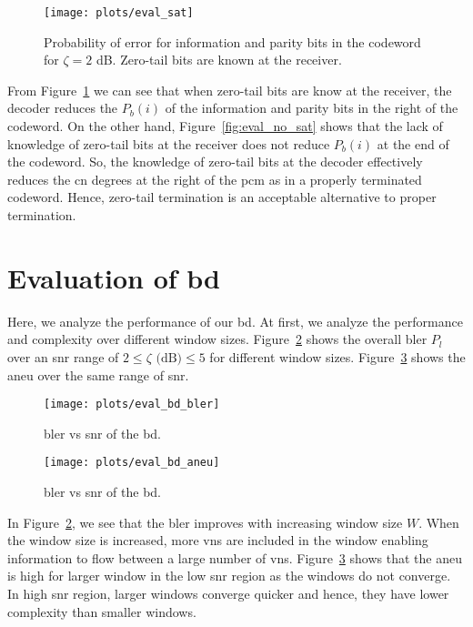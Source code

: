 \begin{figure}[htbp]
  \centering
  \texttt{[image: plots/eval\_sat]}
  \caption{Probability of error for information and parity bits in the codeword for $\zeta=2$ dB. Zero-tail bits are known at the receiver.}
  \label{fig:eval_sat}
\end{figure}
 
From Figure~\ref{fig:eval_sat} we can see that when zero-tail bits are know at the receiver, the decoder reduces the $P_b(i)$ of the information and parity bits in the right of the codeword. On the other hand, Figure~\ref{fig:eval_no_sat} shows that the lack of knowledge of zero-tail bits at the receiver does not reduce $P_b(i)$ at the end of the codeword. So, the knowledge of zero-tail bits at the decoder effectively reduces the \gls{cn} degrees at the right of the \gls{pcm} as in a properly terminated codeword. Hence, zero-tail termination is an acceptable alternative to proper termination.
 
\section{Evaluation of \acrlong{bd}}
Here, we analyze the performance of our \gls{bd}. At first, we analyze the performance and complexity over different window sizes. Figure~\ref{fig:eval_bd_bler} shows the overall \gls{bler} $P_l$ over an \gls{snr} range of $2\leq\zeta\text{ (dB)}\leq 5$ for different window sizes. Figure~\ref{fig:eval_bd_aneu} shows the \gls{aneu} over the same range of \gls{snr}.
\begin{figure}[htbp]
  \centering
  \texttt{[image: plots/eval\_bd\_bler]}
  \caption{\gls{bler} vs \gls{snr} of the \acrfull{bd}.}
  \label{fig:eval_bd_bler}
\end{figure}
\begin{figure}[htbp]
   \centering
  \texttt{[image: plots/eval\_bd\_aneu]}
  \caption{\gls{bler} vs \gls{snr} of the \acrfull{bd}.}
  \label{fig:eval_bd_aneu}
\end{figure}

In Figure~\ref{fig:eval_bd_bler}, we see that the \gls{bler} improves with increasing window size $W$. When the window size is increased, more \glspl{vn} are included in the window enabling information to flow between a large number of \glspl{vn}. Figure~\ref{fig:eval_bd_aneu} shows that the \gls{aneu} is high for larger window in the low \gls{snr} region as the windows do not converge. In high \gls{snr} region, larger windows converge quicker and hence, they have lower complexity than smaller windows.

